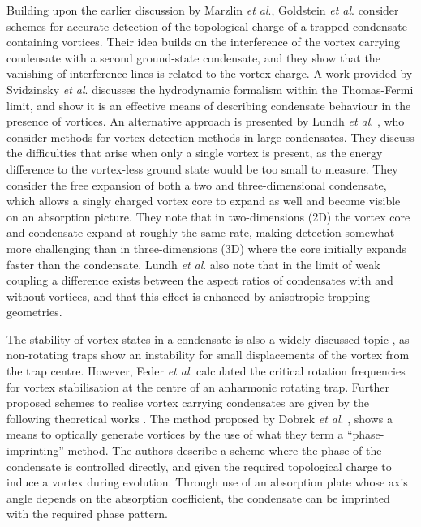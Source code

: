 Building upon the earlier discussion by Marzlin \textit{et al}., Goldstein \textit{et al}. \cite{Vtx:Goldstein_pra_1998} consider schemes for accurate detection of the topological charge of a trapped condensate containing vortices. Their idea builds on the interference of the vortex carrying condensate with a second ground-state condensate, and they show that the vanishing of interference lines is related to the vortex charge. A work provided by Svidzinsky \textit{et al}. \cite{Vtx:Svidzinsky_pra_1998} discusses the hydrodynamic formalism within the Thomas-Fermi limit, and show it is an effective means of describing condensate behaviour in the presence of vortices. An alternative approach is presented by Lundh \textit{et al}. \cite{Vtx:Lundh_pra_1998}, who consider methods for vortex detection methods in large condensates. They discuss the difficulties that arise when only a single vortex is present, as the energy difference to the vortex-less ground state would be too small to measure. They consider the free expansion of both a two and three-dimensional condensate, which allows a singly charged vortex core to expand as well and become visible on an absorption picture. They note that in two-dimensions (2D) the vortex core and condensate expand at roughly the same rate, making detection somewhat more challenging than in three-dimensions (3D) where the core initially expands faster than the condensate. Lundh \textit{et al}. also note that in the limit of weak coupling a difference exists between the aspect ratios of condensates with and without vortices, and that this effect is enhanced by anisotropic trapping geometries.

The stability of vortex states in a condensate is also a widely discussed topic \cite{Vtx:Fedichev_pra_1999,Vtx:Feder_prl_1999}, as non-rotating traps show an instability for small displacements of the vortex from the trap centre. However, Feder \textit{et al}. \cite{Vtx:Feder_prl_1999} calculated the critical rotation frequencies for vortex stabilisation at the centre of an anharmonic rotating trap. Further proposed schemes to realise vortex carrying condensates are given by the following theoretical works \cite{Vtx:Anglin_prl_1999,Vtx:Davies_prl_1999,Vtx:Marshall_pra_1999,Vtx:Dobrek_pra_1999}. The method proposed by Dobrek \textit{et al}. \cite{Vtx:Dobrek_pra_1999}, shows a means to optically generate vortices by the use of what they term a ``phase-imprinting'' method. The authors describe a scheme where
the phase of the condensate is controlled directly, and given the required topological charge to induce a vortex during evolution. Through use of an absorption plate whose axis angle depends on the absorption coefficient, the condensate can be imprinted with the required phase pattern.

